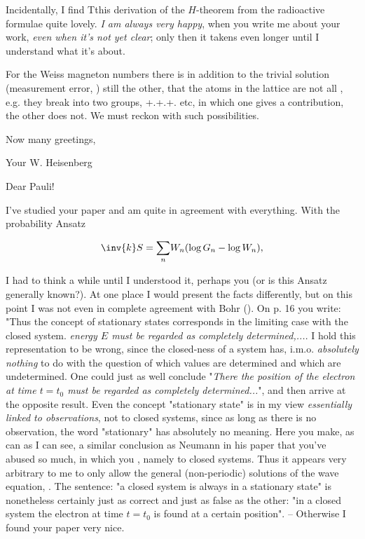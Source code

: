 \documentclass{article}
\newcommand{\uequ}[1]{
\begin{align*}
#1
\end{align*}
}
\newcommand{\sumX}[1]{\underset{#1}{\sum}}
\begin{document}
Incidentally, I find Tthis derivation of the $H$-theorem from the radioactive formulae quite lovely. \textit{I am always very happy}, when you write me about your work, \textit{even when it's not yet clear}; only then it takens even longer until I understand what it's about.

For the Weiss magneton numbers there is in addition to the trivial solution (measurement error, ) still the other, that the atoms in the lattice are not all , e.g. they break into two groups, +.+.+. etc, in which one gives a contribution, the other does not. We must reckon with such possibilities.

Now many greetings,

Your W. Heisenberg

\date{July 31, 1928}

Dear Pauli!

I've studied your paper and am quite in agreement with everything. With the probability Ansatz
\uequ{
\inv{k}S = \sumX{n}W_n (\log G_n - \log W_n),
}
I had to think a while until I understood it, perhaps you  (or is this Ansatz generally known?). At one place I would present the facts differently, but on this point I was not even in complete agreement with Bohr (). On p. 16 you write: "Thus the concept of stationary states corresponds in the limiting case with the closed system. \textit{ energy $E$ must be regarded as completely determined,...}. I hold this representation to be wrong, since the closed-ness of a system has, i.m.o. \textit{absolutely nothing} to do with the question of which values are determined and which are undetermined. One could just as well conclude "\textit{There the position of the electron at time $t=t_0$ must be regarded as completely determined...}", and then arrive at the opposite result. Even the concept "stationary state" is in my view \textit{essentially linked to observations}, not to closed systems, since as long as there is no observation, the word "stationary" has absolutely no meaning. Here you make, as can as I can see, a similar conclusion as Neumann in his paper that you've abused so much, in which you , namely to closed systems. Thus it appears very arbitrary to me to only allow the general (non-periodic) solutions of the wave equation, . The sentence: "a closed system is always in a stationary state" is nonetheless certainly just as correct and just as false as the other: "in a closed system the electron at time $t=t_0$ is found at a certain position". -- Otherwise I found your paper very nice.
\end{document}
